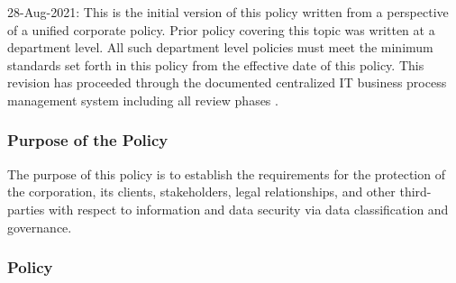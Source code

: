 \documentclass[stu]{apa7}
\begin{document}
28-Aug-2021: This is the initial version of this policy written from a perspective of a unified corporate policy. Prior policy covering this topic was written at a department level. All such department level policies must meet the minimum standards set forth in this policy from the effective date of this policy. This revision has proceeded through the documented centralized IT business process management system including all review phases \cite{wagleDevelopmentEffectiveCentralized2021}.

\subsubsection{Purpose of the Policy}
\label{sec:orgb0483ff}

The purpose of this policy is to establish the requirements for the protection of the corporation, its clients, stakeholders, legal relationships, and other third-parties with respect to information and data security via data classification and governance.


\subsubsection{Policy}
\label{sec:org1c8a9ab}
\end{document}

